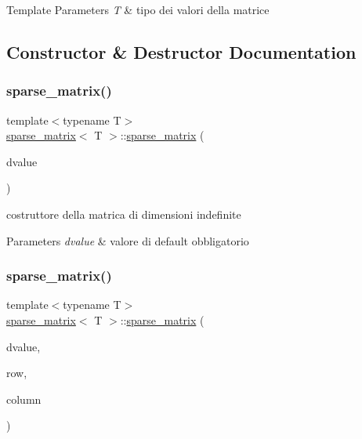\begin{DoxyTemplParams}{Template Parameters}
{\em T} & tipo dei valori della matrice \\
\hline
\end{DoxyTemplParams}


\subsection{Constructor \& Destructor Documentation}
\mbox{\label{classsparse__matrix_ae113bb914d2c00cc0fad5051c9584212}} 
\subsubsection{\texorpdfstring{sparse\+\_\+matrix()}{sparse\_matrix()}\hspace{0.1cm}{\footnotesize\ttfamily [1/4]}}
{\footnotesize\ttfamily template$<$typename T$>$ \\
\hyperlink{classsparse__matrix}{sparse\+\_\+matrix}$<$ T $>$\+::\hyperlink{classsparse__matrix}{sparse\+\_\+matrix} (\begin{DoxyParamCaption}\item[{T}]{dvalue }\end{DoxyParamCaption})\hspace{0.3cm}{\ttfamily [inline]}}



costruttore della matrica di dimensioni indefinite 


\begin{DoxyParams}{Parameters}
{\em dvalue} & valore di default obbligatorio \\
\hline
\end{DoxyParams}
\mbox{\label{classsparse__matrix_a50752ee013539dc27ac4c6fe7445ba38}} 
\subsubsection{\texorpdfstring{sparse\+\_\+matrix()}{sparse\_matrix()}\hspace{0.1cm}{\footnotesize\ttfamily [2/4]}}
{\footnotesize\ttfamily template$<$typename T$>$ \\
\hyperlink{classsparse__matrix}{sparse\+\_\+matrix}$<$ T $>$\+::\hyperlink{classsparse__matrix}{sparse\+\_\+matrix} (\begin{DoxyParamCaption}\item[{T}]{dvalue,  }\item[{unsigned int}]{row,  }\item[{unsigned int}]{column }\end{DoxyParamCaption})\hspace{0.3cm}{\ttfamily [inline]}}




